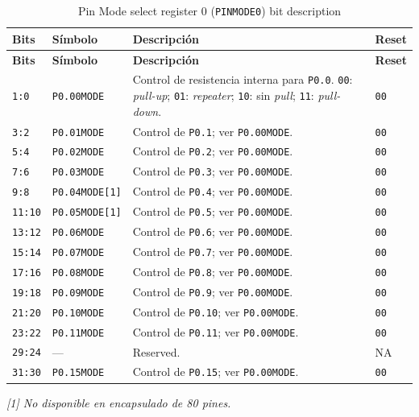 \begin{longtable}{|>{\raggedright\arraybackslash}p{}|>{\raggedright\arraybackslash}p{}|>{\raggedright\arraybackslash}p{}|>{\centering\arraybackslash}p{}|}
\caption{Pin Mode select register 0 (\texttt{PINMODE0}) bit description}\\
\hline
\textbf{Bits} & \textbf{Símbolo} & \textbf{Descripción} & \textbf{Reset} \\
\hline
\endfirsthead
\hline
\textbf{Bits} & \textbf{Símbolo} & \textbf{Descripción} & \textbf{Reset} \\
\hline
\endhead
\texttt{1:0} & \texttt{P0.00MODE} & Control de resistencia interna para \texttt{P0.0}. \texttt{00}: \textit{pull-up}; \texttt{01}: \textit{repeater}; \texttt{10}: sin \textit{pull}; \texttt{11}: \textit{pull-down}. & \texttt{00} \\
\hline
\texttt{3:2} & \texttt{P0.01MODE} & Control de \texttt{P0.1}; ver \texttt{P0.00MODE}. & \texttt{00} \\
\hline
\texttt{5:4} & \texttt{P0.02MODE} & Control de \texttt{P0.2}; ver \texttt{P0.00MODE}. & \texttt{00} \\
\hline
\texttt{7:6} & \texttt{P0.03MODE} & Control de \texttt{P0.3}; ver \texttt{P0.00MODE}. & \texttt{00} \\
\hline
\texttt{9:8} & \texttt{P0.04MODE[1]} & Control de \texttt{P0.4}; ver \texttt{P0.00MODE}. & \texttt{00} \\
\hline
\texttt{11:10} & \texttt{P0.05MODE[1]} & Control de \texttt{P0.5}; ver \texttt{P0.00MODE}. & \texttt{00} \\
\hline
\texttt{13:12} & \texttt{P0.06MODE} & Control de \texttt{P0.6}; ver \texttt{P0.00MODE}. & \texttt{00} \\
\hline
\texttt{15:14} & \texttt{P0.07MODE} & Control de \texttt{P0.7}; ver \texttt{P0.00MODE}. & \texttt{00} \\
\hline
\texttt{17:16} & \texttt{P0.08MODE} & Control de \texttt{P0.8}; ver \texttt{P0.00MODE}. & \texttt{00} \\
\hline
\texttt{19:18} & \texttt{P0.09MODE} & Control de \texttt{P0.9}; ver \texttt{P0.00MODE}. & \texttt{00} \\
\hline
\texttt{21:20} & \texttt{P0.10MODE} & Control de \texttt{P0.10}; ver \texttt{P0.00MODE}. & \texttt{00} \\
\hline
\texttt{23:22} & \texttt{P0.11MODE} & Control de \texttt{P0.11}; ver \texttt{P0.00MODE}. & \texttt{00} \\
\hline
\texttt{29:24} & --- & Reserved. & NA \\
\hline
\texttt{31:30} & \texttt{P0.15MODE} & Control de \texttt{P0.15}; ver \texttt{P0.00MODE}. & \texttt{00} \\
\hline
\end{longtable}
\noindent\textit{[1] No disponible en encapsulado de 80 pines.}

